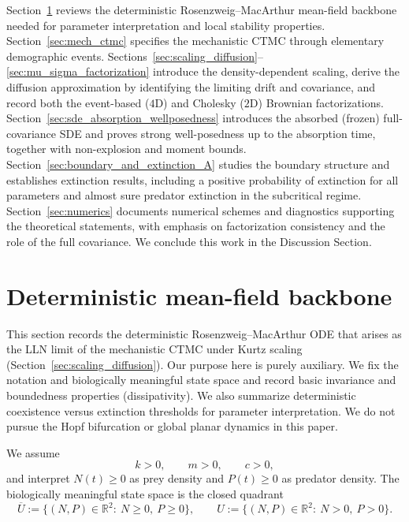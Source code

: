 \documentclass[pdflatex,sn-mathphys-ay]{sn-jnl}
\theoremstyle{thmstyleone}
\theoremstyle{definition}
\theoremstyle{remark}
\begin{document}
Section~\ref{sec:deterministic_backbone_A} reviews the deterministic Rosenzweig--MacArthur mean-field backbone needed for parameter interpretation and local stability properties. Section~\ref{sec:mech_ctmc} specifies the mechanistic CTMC through elementary demographic events. Sections~\ref{sec:scaling_diffusion}--\ref{sec:mu_sigma_factorization} introduce the density-dependent scaling,
derive the diffusion approximation by identifying the limiting drift and covariance, and record both the event-based ($4$D) and Cholesky ($2$D) Brownian factorizations. Section~\ref{sec:sde_absorption_wellposedness} introduces the absorbed (frozen) full-covariance SDE and proves strong well-posedness up to the absorption time, together with non-explosion and moment bounds. 
Section~\ref{sec:boundary_and_extinction_A} studies the boundary structure
and establishes extinction results, including a positive probability of extinction for all parameters and almost sure predator extinction in the subcritical regime. Section~\ref{sec:numerics} documents numerical schemes and diagnostics supporting the theoretical statements, with emphasis on factorization consistency and the role of the full covariance. We conclude this work in the Discussion Section.

\section{Deterministic mean-field backbone}
\label{sec:deterministic_backbone_A}

This section records the deterministic Rosenzweig--MacArthur ODE that arises as the LLN
limit of the mechanistic CTMC under Kurtz scaling (Section~\ref{sec:scaling_diffusion}). 
Our purpose here is purely
auxiliary. We fix the notation and biologically meaningful state space and record basic invariance and
boundedness properties (dissipativity). We also summarize deterministic coexistence versus extinction
thresholds for parameter interpretation. We do not pursue the Hopf bifurcation or global planar dynamics in this
paper.


We assume
\begin{equation}\label{eq:det_params_assumptions_A}
k>0,\qquad m>0,\qquad c>0,
\end{equation}
and interpret $N(t)\ge0$ as prey density and $P(t)\ge0$ as predator density.
The biologically meaningful state space is the closed quadrant
\[
\overline U := \{(N,P)\in\mathbb R^2:\ N\ge 0,\ P\ge 0\},\qquad
U := \{(N,P)\in\mathbb R^2:\ N>0,\ P>0\}.
\]
\end{document}
